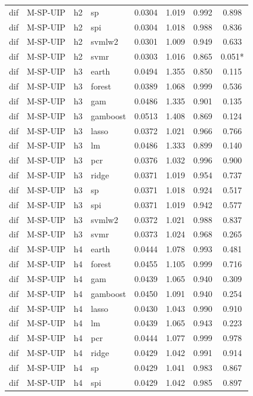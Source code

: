 \begin{ThreePartTable}
\begin{longtable}[t]{llclcccc}
dif & M-SP-UIP & h2 & sp & 0.0304 & 1.019 & 0.992 & 0.898\\
dif & M-SP-UIP & h2 & spi & 0.0304 & 1.018 & 0.988 & 0.836\\
dif & M-SP-UIP & h2 & svmlw2 & 0.0301 & 1.009 & 0.949 & 0.633\\
dif & M-SP-UIP & h2 & svmr & 0.0303 & 1.016 & 0.865 & 0.051*\\
\addlinespace
dif & M-SP-UIP & h3 & earth & 0.0494 & 1.355 & 0.850 & 0.115\\
dif & M-SP-UIP & h3 & forest & 0.0389 & 1.068 & 0.999 & 0.536\\
dif & M-SP-UIP & h3 & gam & 0.0486 & 1.335 & 0.901 & 0.135\\
dif & M-SP-UIP & h3 & gamboost & 0.0513 & 1.408 & 0.869 & 0.124\\
dif & M-SP-UIP & h3 & lasso & 0.0372 & 1.021 & 0.966 & 0.766\\
dif & M-SP-UIP & h3 & lm & 0.0486 & 1.333 & 0.899 & 0.140\\
dif & M-SP-UIP & h3 & pcr & 0.0376 & 1.032 & 0.996 & 0.900\\
dif & M-SP-UIP & h3 & ridge & 0.0371 & 1.019 & 0.954 & 0.737\\
dif & M-SP-UIP & h3 & sp & 0.0371 & 1.018 & 0.924 & 0.517\\
dif & M-SP-UIP & h3 & spi & 0.0371 & 1.019 & 0.942 & 0.577\\
dif & M-SP-UIP & h3 & svmlw2 & 0.0372 & 1.021 & 0.988 & 0.837\\
dif & M-SP-UIP & h3 & svmr & 0.0373 & 1.024 & 0.968 & 0.265\\
\addlinespace
dif & M-SP-UIP & h4 & earth & 0.0444 & 1.078 & 0.993 & 0.481\\
dif & M-SP-UIP & h4 & forest & 0.0455 & 1.105 & 0.999 & 0.716\\
dif & M-SP-UIP & h4 & gam & 0.0439 & 1.065 & 0.940 & 0.309\\
dif & M-SP-UIP & h4 & gamboost & 0.0450 & 1.091 & 0.940 & 0.254\\
dif & M-SP-UIP & h4 & lasso & 0.0430 & 1.043 & 0.990 & 0.910\\
dif & M-SP-UIP & h4 & lm & 0.0439 & 1.065 & 0.943 & 0.223\\
dif & M-SP-UIP & h4 & pcr & 0.0444 & 1.077 & 0.999 & 0.978\\
dif & M-SP-UIP & h4 & ridge & 0.0429 & 1.042 & 0.991 & 0.914\\
dif & M-SP-UIP & h4 & sp & 0.0429 & 1.041 & 0.983 & 0.867\\
dif & M-SP-UIP & h4 & spi & 0.0429 & 1.042 & 0.985 & 0.897\\

\end{longtable}
\end{ThreePartTable}
